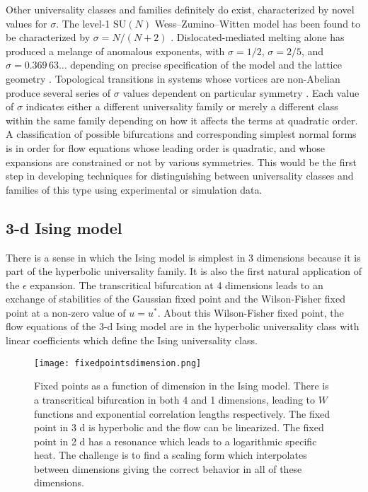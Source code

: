 \documentclass[
 reprint,
 amsmath,amssymb,
 aps, superscriptaddress, pre
]{revtex4-1}
\begin{document}

Other universality classes and families definitely do exist, characterized by novel values
for $\sigma$. The level-1 $\mathrm{SU}(N)$ Wess--Zumino--Witten model has been
found to be characterized by $\sigma=N/(N+2)$ \cite{itoi1997extended}.
Dislocated-mediated melting alone has produced a melange of anomalous
exponents, with $\sigma=1/2$, $\sigma=2/5$, and $\sigma=0.369\,63\ldots$
depending on precise specification of the model and the lattice geometry
\cite{nelson1979dislocation, young1979melting}. Topological transitions in
systems whose vortices are non-Abelian produce several series of $\sigma$
values dependent on particular symmetry \cite{bulgadaev1999berezinskii}. Each
value of $\sigma$ indicates either a different universality family or merely a different class within the same family depending on how it affects the terms at quadratic order. A classification of possible
bifurcations and corresponding simplest normal forms is in order for flow
equations whose leading order is quadratic, and whose expansions are
constrained or not by various symmetries. This would be the first step in developing techniques for
distinguishing between universality classes and families of this type using
experimental or simulation data. 


\subsection{3-d Ising model} \label{sec:3dising}

There is a sense in which the Ising model is simplest in 3 dimensions because it is part of the hyperbolic universality family. It is also the first natural application of the $\epsilon$ expansion. The transcritical bifurcation at 4 dimensions leads to an exchange of stabilities of the Gaussian fixed point and the Wilson-Fisher fixed point at a non-zero value of $u = u^*$. About this Wilson-Fisher fixed point, the flow equations of the 3-d Ising model are in the hyperbolic universality class with linear coefficients which define the Ising universality class. 

\begin{figure}
 \texttt{[image: fixedpointsdimension.png]}
\caption{Fixed points as a function of dimension in the Ising model. There is a transcritical bifurcation in both 4 and 1 dimensions, leading to $W$ functions and exponential correlation lengths respectively. The fixed point in 3 d is hyperbolic and the flow can be linearized. The fixed point in 2 d has a resonance which leads to a logarithmic specific heat. The challenge is to find a scaling form which interpolates between dimensions giving the correct behavior in all of these dimensions.}
 \end{figure}
\end{document}
